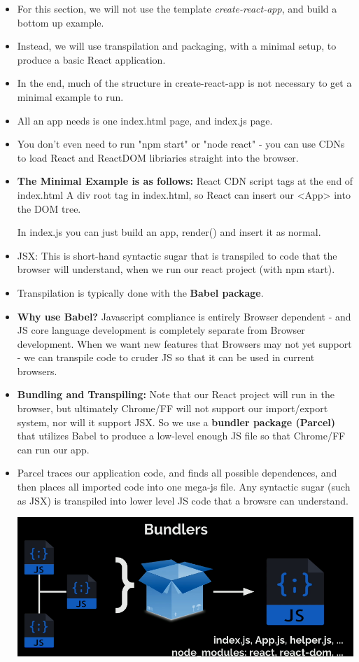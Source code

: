 \documentclass[8pt,a4paper]{extarticle}
\begin{document}
\begin{itemize}
\item For this section, we will not use the template \textit{create-react-app}, and build a bottom up example.
\item Instead, we will use transpilation and packaging, with a minimal setup, to produce a basic React application.
\item In the end, much of the structure in create-react-app is not necessary to get a minimal example to run.
\item All an app needs is one index.html page, and index.js page.
\item You don't even need to run "npm start" or "node react" - you can use CDNs to load React and ReactDOM libriaries straight into the browser.
\item \textbf{The Minimal Example is as follows:}
\mitem React CDN script tags at the end of index.html
\mitem A div root tag in index.html, so React can insert our <App> into the DOM tree.

In index.js you can just build an app, render() and insert it as normal.
\item JSX: This is short-hand syntactic sugar that is transpiled to code that the browser will understand, when we run our react project (with npm start).
\item Transpilation is typically done with the \textbf{Babel package}.
\item \textbf{Why use Babel?} Javascript compliance is entirely Browser dependent - and JS core language development is completely separate from Browser development. When we want new features that Browsers may not yet support - we can transpile code to cruder JS so that it can be used in current browsers.

\item \textbf{Bundling and Transpiling:} Note that our React project will run in the browser, but ultimately Chrome/FF will not support our import/export system, nor will it support JSX. So we use a \textbf{bundler package (Parcel)} that utilizes Babel to produce a low-level enough JS file so that Chrome/FF can run our app. 
\item Parcel traces our application code, and finds all possible dependences, and then places all imported code into one mega-js file. Any syntactic sugar (such as JSX) is transpiled into lower level JS code that a browsre can understand.

\includegraphics[scale=0.5]{bundle.png}


\end{itemize}
\end{document}
